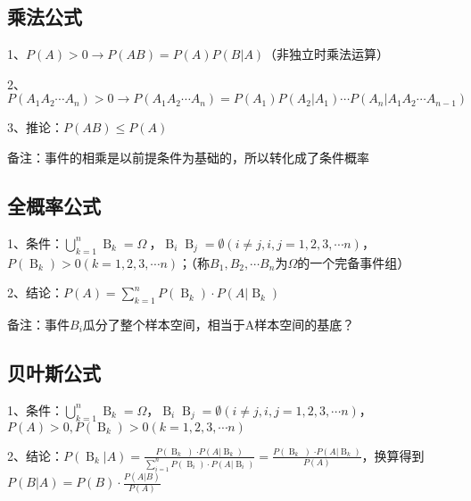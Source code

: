 \subsection{乘法公式}

1、$P(A)>0 \rightarrow P(AB)=P(A)P(B|A)$（非独立时乘法运算）

2、$P(A_1A_2\cdots A_n) > 0 \rightarrow P(A_1A_2\cdots A_n)=P(A_1)P(A_2|A_1)\cdots P(A_n|A_1A_2\cdots A_{n-1})$

3、推论：$P(AB) \le P(A)$

备注：事件的相乘是以前提条件为基础的，所以转化成了条件概率



\subsection{全概率公式}

1、条件：$\mathop{ \bigcup }\limits_{{k=1}}^{{n}}\mathop{{B}}\nolimits_{{k}}=\Omega \ $，$\mathop{{B}}\nolimits_{{i}}\mathop{{B}}\nolimits_{{j}}= \emptyset { \left( {i \neq j,i,j=1,2,3, \cdots n} \right) }$，$P{ \left( {\mathop{{B}}\nolimits_{{k}}} \right) } > 0{ \left( {k=1,2,3, \cdots n} \right) }$；（称$B_1,B_2,\cdots B_n$为$\Omega$的一个完备事件组）

2、结论：$P{ \left( {A} \right) }=\mathop{ \sum }\limits_{{k=1}}^{{n}}P{ \left( {\mathop{{B}}\nolimits_{{k}}} \right) } \cdot P{ \left( {A \left| \mathop{{B}}\nolimits_{{k}}\right. } \right) }$

备注：事件$B_i$瓜分了整个样本空间，相当于A样本空间的基底？



\subsection{贝叶斯公式}

1、条件：$\mathop{ \bigcup }\limits_{{k=1}}^{{n}}\mathop{{B}}\nolimits_{{k}}=\Omega$，$\mathop{{B}}\nolimits_{{i}}\mathop{{B}}\nolimits_{{j}}= \emptyset { \left( {i \neq j,i,j=1,2,3, \cdots n} \right) }$，$P(A) > 0,P{ \left( {\mathop{{B}}\nolimits_{{k}}} \right) } > 0{ \left( {k=1,2,3, \cdots n} \right) }$

2、结论：$P{ \left( {\mathop{{B}}\nolimits_{{k}} \left| A\right. } \right) }=\frac{{P \left( {\mathop{{B}}\nolimits_{{k}}} \left) \cdot P{ \left( {A \left| {\mathop{{B}}\nolimits_{{k}}}\right. } \right) }\right. \right. }}{{\mathop{ \sum }\limits_{{i=1}}^{{n}}P{ \left( {\mathop{{B}}\nolimits_{{i}}} \right) } \cdot P{ \left( {A \left| \mathop{{B}}\nolimits_{{i}}\right. } \right) }}}=\frac{{P \left( {\mathop{{B}}\nolimits_{{k}}} \left) \cdot P{ \left( {A \left| {\mathop{{B}}\nolimits_{{k}}}\right. } \right) }\right. \right. }}{P(A)}$，换算得到$P(B|A)=P(B)\cdot \frac{P(A|B)}{P(A)}$

